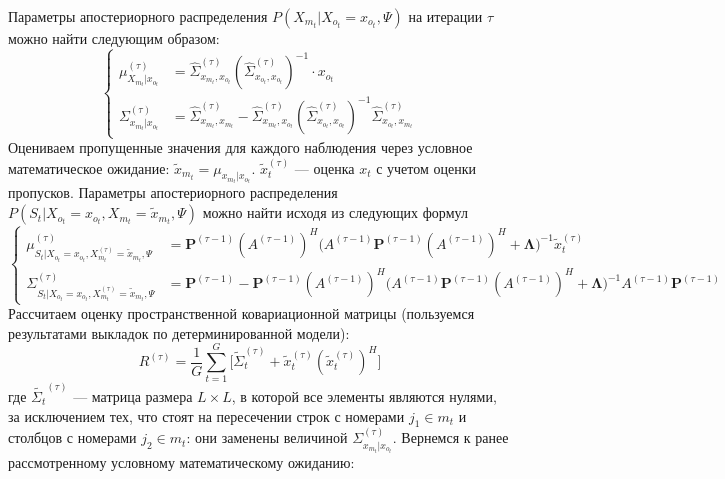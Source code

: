 \documentclass[11pt]{article}
\begin{document}
Параметры апостериорного распределения $P(X_{m_t}|X_{o_t}=x_{o_t},\Psi)$ на итерации $\tau$ можно найти следующим образом:
\begin{equation}
\left\{ \begin{aligned} 
\mu_{X_{m_t}|x_{o_t}}^{(\tau)} &= \hat{\Sigma}_{x_{m_t},x_{o_t}}^{(\tau)}(\hat{\Sigma}_{x_{o_t},x_{o_t}}^{(\tau)})^{-1}\cdot x_{o_t} \\
\Sigma_{x_{m_t}|x_{o_t}}^{(\tau)} &= \hat{\Sigma}_{x_{m_t},x_{m_t}}^{(\tau)}-\hat{\Sigma}_{x_{m_t},x_{o_t}}^{(\tau)}(\hat{\Sigma}_{x_{o_t},x_{o_t}}^{(\tau)})^{-1}\hat{\Sigma}_{x_{o_t},x_{m_t}}^{(\tau)}
\end{aligned} \right.
\end{equation}
Оцениваем пропущенные значения для каждого наблюдения через условное математическое ожидание:
$\widetilde{x}_{m_t} = \mu_{x_{m_t}|x_{o_t}}$. $\widetilde{x}_t^{(\tau)}$ --- оценка $x_t$ с учетом оценки пропусков.
Параметры апостериорного распределения $P(S_t|X_{o_t} = x_{o_t}, X_{m_t} = \widetilde{x}_{m_t}, \Psi)$ можно найти исходя из следующих формул
\begin{equation}
\left\{ \begin{aligned} 
\mu_{S_t|X_{o_t} = x_{o_t}, X_{m_t}^{(\tau)} = \widetilde{x}_{m_t}, \Psi}^{(\tau)} &= \mathbf{P}^{(\tau-1)}(A^{(\tau-1)})^H\Big(A^{(\tau-1)}\mathbf{P}^{(\tau-1)}(A^{(\tau-1)})^H+\mathbf{\Lambda}\Big)^{-1}\widetilde{x}_t^{(\tau)} \\
\Sigma_{S_t|X_{o_t} = x_{o_t}, X_{m_t}^{(\tau)} = \widetilde{x}_{m_t}, \Psi}^{(\tau)} &= \mathbf{P}^{(\tau-1)} - \mathbf{P}^{(\tau-1)}(A^{(\tau-1)})^H\Big(A^{(\tau-1)}\mathbf{P}^{(\tau-1)}(A^{(\tau-1)})^H+\mathbf{\Lambda}\Big)^{-1}A^{(\tau-1)}\mathbf{P}^{(\tau-1)}
\end{aligned} \right.
\end{equation}
Рассчитаем оценку пространственной ковариационной матрицы (пользуемся результатами выкладок по детерминированной модели):
\begin{equation}
{R}^{(\tau)} = \frac{1}{G} \sum_{t = 1}^{G} \Big[ \widetilde{\Sigma}_{t}^{(\tau)} + \widetilde{x}_t^{(\tau)}(\widetilde{x}_t^{(\tau)})^H \Big]
\end{equation}
где $\widetilde{\Sigma_{t}}^{(\tau)}$ --- матрица размера $L \times L$, в которой все элементы являются нулями, за исключением тех, что стоят на пересечении строк с номерами $j_1 \in m_t$ и столбцов с номерами $j_2 \in m_t$: они заменены величиной $\Sigma^{(\tau)}_{x_{m_t}|x_{o_t}}$.
Вернемся к ранее рассмотренному условному математическому ожиданию:
\end{document}
